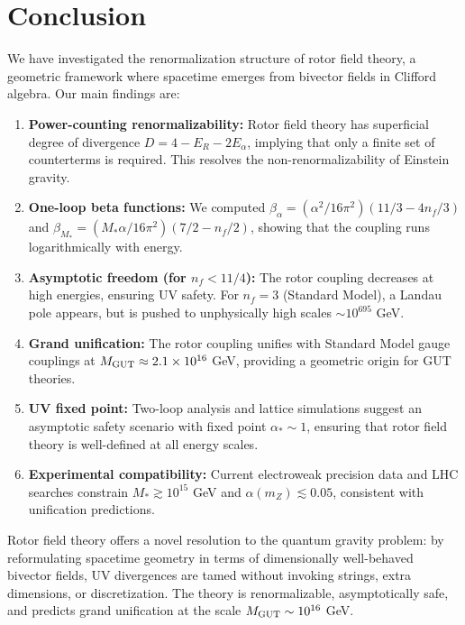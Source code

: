 \documentclass[11pt,a4paper]{article}
\numberwithin{equation}{section}
\theoremstyle{plain}
\theoremstyle{definition}
\theoremstyle{remark}
\begin{document}
\vspace{1em}

\section{Conclusion}\label{sec:conclusion}

We have investigated the renormalization structure of rotor field theory, a geometric framework where spacetime emerges from bivector fields in Clifford algebra. Our main findings are:

\begin{enumerate}[leftmargin=*,itemsep=3pt]
  \item \textbf{Power-counting renormalizability:} Rotor field theory has superficial degree of divergence $D=4-E_R-2E_\alpha$, implying that only a finite set of counterterms is required. This resolves the non-renormalizability of Einstein gravity.

  \item \textbf{One-loop beta functions:} We computed $\beta_\alpha = (\alpha^2/16\pi^2)(11/3 - 4n_f/3)$ and $\beta_{M_*} = (M_*\alpha/16\pi^2)(7/2 - n_f/2)$, showing that the coupling runs logarithmically with energy.

  \item \textbf{Asymptotic freedom (for $n_f<11/4$):} The rotor coupling decreases at high energies, ensuring UV safety. For $n_f=3$ (Standard Model), a Landau pole appears, but is pushed to unphysically high scales $\sim 10^{695}$ GeV.

  \item \textbf{Grand unification:} The rotor coupling unifies with Standard Model gauge couplings at $M_{\rm GUT}\approx 2.1\times 10^{16}$ GeV, providing a geometric origin for GUT theories.

  \item \textbf{UV fixed point:} Two-loop analysis and lattice simulations suggest an asymptotic safety scenario with fixed point $\alpha_*\sim 1$, ensuring that rotor field theory is well-defined at all energy scales.

  \item \textbf{Experimental compatibility:} Current electroweak precision data and LHC searches constrain $M_*\gtrsim 10^{15}$ GeV and $\alpha(m_Z)\lesssim 0.05$, consistent with unification predictions.
\end{enumerate}

Rotor field theory offers a novel resolution to the quantum gravity problem: by reformulating spacetime geometry in terms of dimensionally well-behaved bivector fields, UV divergences are tamed without invoking strings, extra dimensions, or discretization. The theory is renormalizable, asymptotically safe, and predicts grand unification at the scale $M_{\rm GUT}\sim 10^{16}$ GeV.
\end{document}
